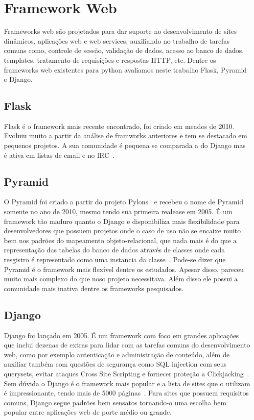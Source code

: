 \documentclass[a4paper, 12pt, oneside]{book}
\begin{document}
\section{Framework Web}
Frameworks web são projetados para dar suporte no desenvolvimento de sites dinâmicos, aplicações web e web services, auxiliando no trabalho de tarefas comuns como, controle de sessão, validação de dados, acesso ao banco de dados, templates, tratamento de requisições e respostas HTTP, etc. Dentre os frameworks web existentes para python avaliamos neste trabalho Flask, Pyramid e Django.
\subsection{Flask}
Flask é o framework mais recente encontrado, foi criado em meados de 2010. Evoluiu muito a partir da análise de framworks anteriores e tem se destacado em pequenos projetos. A sua comunidade é pequena se comparada a do Django mas é ativa em listas de email e no IRC~\cite{ryanbrown}. 

\subsection{Pyramid}
O Pyramid foi criado a partir do projeto Pylons~\cite{pylonsproject} e recebeu o nome de Pyramid somente no ano de 2010, mesmo tendo sua primeira realease em 2005. É um framework tão maduro quanto o Django e disponibiliza mais flexibilidade para desenvolvedores que possuem projetos onde o caso de uso não se encaixe muito bem nos padrões do mapeamento objeto-relacional, que nada mais é do que a representação das tabelas do banco de dados através de classes onde cada resgistro é representado como uma instancia da classe~\cite{pyramid}. Pode-se dizer que Pyramid é o framework mais flexível dentre os estudados. Apesar disso, pareceu muito mais complexo do que noso projeto necessitava. Além disso ele possui a comunidade mais inativa dentre os frameworks pesquisados.

\subsection{Django}
Django foi lançado em 2005. É um framework com foco em grandes aplicações que inclui dezenas de extras para lidar com as tarefas comuns do desenvolvimento web, como por exemplo autenticação e administração de conteúdo, além de auxiliar também com questões de segurança como SQL injection com seus querysets, evitar ataques Cross Site Scripting e fornecer proteção a Clickjacking~\cite{django}. Sem dúvida o Django é o framework mais popular e a lista de sites que o utilizam é impressionante, tendo mais de 5000 páginas~\cite{listadjangosites}. Para sites que possuem requisitos comuns, Django segue padrões bem sensatos tornando-o uma escolha bem popular entre aplicações web de porte médio ou grande.
\end{document}
